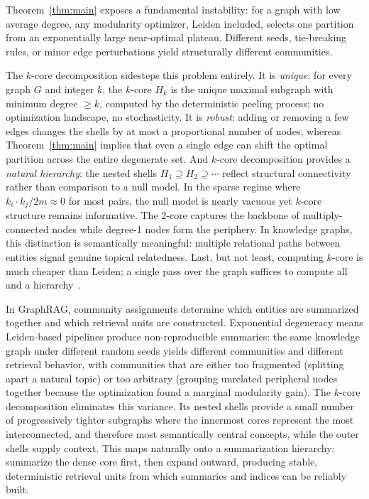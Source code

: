 \documentclass[sigconf]{acmart}
\begin{document}
Theorem~\ref{thm:main} exposes a fundamental instability: for a graph with low average degree, any modularity optimizer, Leiden included, selects one partition from an exponentially large near-optimal plateau. Different seeds, tie-breaking rules, or minor edge perturbations yield structurally different communities.

The $k$-core decomposition sidesteps this problem entirely. It is \emph{unique}: for every graph $G$ and integer $k$, the $k$-core $H_k$ is the unique maximal subgraph with minimum degree $\geq k$, computed by the deterministic peeling process; no optimization landscape, no stochasticity. It is \emph{robust}: adding or removing a few edges changes the shells by at most a proportional number of nodes, whereas Theorem~\ref{thm:main} implies that even a single edge can shift the optimal partition across the entire degenerate set. And $k$-core decomposition provides a \emph{natural hierarchy}: the nested shells $H_1 \supseteq H_2 \supseteq \cdots$ reflect structural connectivity rather than comparison to a null model. In the sparse regime where $k_i \cdot k_j/2m \approx 0$ for most pairs, the null model is nearly vacuous yet $k$-core structure remains informative. The 2-core captures the backbone of multiply-connected nodes while degree-1 nodes form the periphery. In knowledge graphs, this distinction is semantically meaningful: multiple relational paths between entities signal genuine topical relatedness. Last, but not least, computing $k$-core is much cheaper than Leiden; a single pass over the graph suffices to compute all and a hierarchy~\cite{Sariyuce16}.

In GraphRAG, community assignments determine which entities are summarized together and which retrieval units are constructed. Exponential degeneracy means Leiden-based pipelines produce non-reproducible summaries: the same knowledge graph under different random seeds yields different communities and different retrieval behavior, with communities that are either too fragmented (splitting apart a natural topic) or too arbitrary (grouping unrelated peripheral nodes together because the optimization found a marginal modularity gain). The
$k$-core decomposition eliminates this variance. 
Its nested shells provide a small number of progressively tighter subgraphs where the innermost cores represent the most interconnected, and therefore most semantically central concepts, while the outer shells supply context. This maps naturally onto a summarization hierarchy: summarize the dense core first, then expand outward, producing stable, deterministic retrieval units from which summaries and indices can be reliably built.
\end{document}
